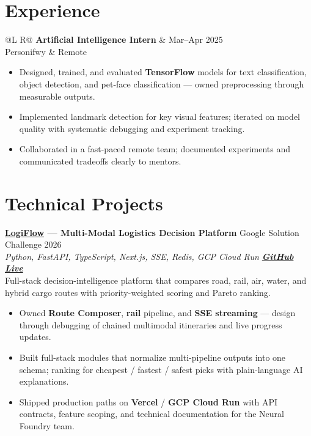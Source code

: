 \documentclass[a4paper,10pt]{article}
\makeatletter
\newcommand{\entry}[4]{%
  \vspace{0.6mm}
  \noindent\begin{tabularx}{\textwidth}{@{}L R@{}}
    \textbf{#1} & {\small #2} \\
    {\small #3} & {\small #4} \\
  \end{tabularx}\par
}
\makeatother
\begin{document}
\section{Experience}
\entry{Artificial Intelligence Intern}{Mar--Apr 2025}{Personifwy}{Remote}
\begin{itemize}
  \item Designed, trained, and evaluated \textbf{TensorFlow} models for text classification, object detection, and pet-face classification --- owned preprocessing through measurable outputs.
  \item Implemented landmark detection for key visual features; iterated on model quality with systematic debugging and experiment tracking.
  \item Collaborated in a fast-paced remote team; documented experiments and communicated tradeoffs clearly to mentors.
\end{itemize}

\section{Technical Projects}
\vspace{0.5mm}
\noindent\textbf{\href{https://github.com/KARANBHAI029/LOGIFLOW}{LogiFlow} --- Multi-Modal Logistics Decision Platform}
\hfill {\small Google Solution Challenge 2026}\\
\textit{\small Python, FastAPI, TypeScript, Next.js, SSE, Redis, GCP Cloud Run \textbar{}
\href{https://github.com/KARANBHAI029/LOGIFLOW}{\textbf{GitHub}} \textbar{}
\href{https://logi-flow-solution-challenge-2026.vercel.app/}{\textbf{Live}}}\\[0.45mm]
Full-stack decision-intelligence platform that compares road, rail, air, water, and hybrid cargo routes with priority-weighted scoring and Pareto ranking.
\begin{itemize}
  \item Owned \textbf{Route Composer}, \textbf{rail} pipeline, and \textbf{SSE streaming} --- design through debugging of chained multimodal itineraries and live progress updates.
  \item Built full-stack modules that normalize multi-pipeline outputs into one schema; ranking for cheapest / fastest / safest picks with plain-language AI explanations.
  \item Shipped production paths on \textbf{Vercel} / \textbf{GCP Cloud Run} with API contracts, feature scoping, and technical documentation for the Neural Foundry team.
\end{itemize}
\end{document}
